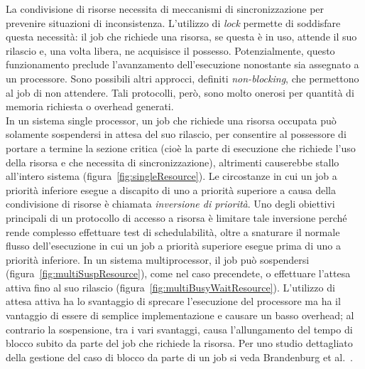 La condivisione di risorse necessita di meccanismi di sincronizzazione per prevenire situazioni di inconsistenza. L'utilizzo di \textit{lock} permette di soddisfare questa necessità: il job che richiede una risorsa, se questa è in uso, attende il suo rilascio e, una volta libera, ne acquisisce il possesso. Potenzialmente, questo funzionamento preclude l'avanzamento dell'esecuzione nonostante sia assegnato a un processore. Sono possibili altri approcci, definiti \textit{non-blocking}, che permettono al job di non attendere. Tali protocolli, però, sono molto onerosi per quantità di memoria richiesta o overhead generati.\\

In un sistema single processor, un job che richiede una risorsa occupata può solamente sospendersi in attesa del suo rilascio, per consentire al possessore di portare a termine la sezione critica (cioè la parte di esecuzione che richiede l'uso della risorsa e che necessita di sincronizzazione), altrimenti causerebbe stallo all'intero sistema (figura~\ref{fig:singleResource}). Le circostanze in cui un job a priorità inferiore esegue a discapito di uno a priorità superiore a causa della condivisione di risorse è chiamata \textit{inversione di priorità}. Uno degli obiettivi principali di un protocollo di accesso a risorsa è limitare tale inversione perché rende complesso effettuare test di schedulabilità, oltre a snaturare il normale flusso dell'esecuzione in cui un job a priorità superiore esegue prima di uno a priorità inferiore. In un sistema multiprocessor, il job può sospendersi (figura~\ref{fig:multiSuspResource}), come nel caso precendete, o effettuare l'attesa attiva fino al suo rilascio (figura~\ref{fig:multiBusyWaitResource}). L'utilizzo di attesa attiva ha lo svantaggio di sprecare l'esecuzione del processore ma ha il vantaggio di essere di semplice implementazione e causare un basso overhead; al contrario la sospensione, tra i vari svantaggi, causa l'allungamento del tempo di blocco subito da parte del job che richiede la risorsa. Per uno studio dettagliato della gestione del caso di blocco da parte di un job si veda Brandenburg et al.~\cite{Brandenburg:2008:RSM:1440456.1440601}.\\

